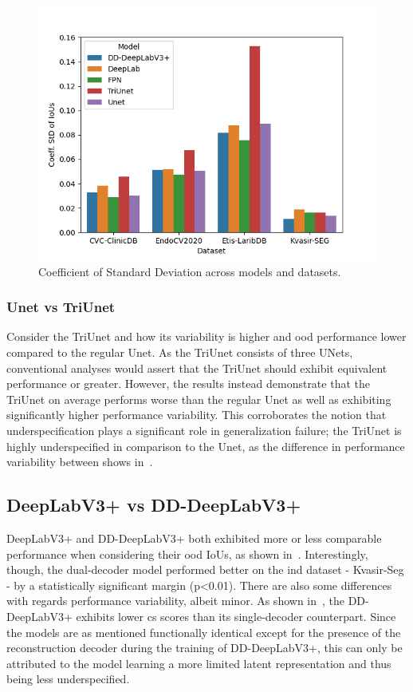     \begin{figure}[htb]
        \centering
        \includegraphics[width=\linewidth]{illustrations/cstd_baseline.png}
        \caption{Coefficient of Standard Deviation across models and datasets.}
        \label{fig:baseline_cstd}
    \end{figure}
    
    \subsubsection{Unet vs TriUnet}
    Consider the TriUnet and how its variability is higher and \gls{ood} performance lower compared to the regular Unet. As the TriUnet consists of three UNets, conventional analyses would assert that the TriUnet should exhibit equivalent performance or greater. However, the results instead demonstrate that the TriUnet on average performs worse than the regular Unet as well as exhibiting significantly higher performance variability. This corroborates the notion that underspecification plays a significant role in generalization failure; the TriUnet is highly underspecified in comparison to the Unet, as the difference in performance variability between shows in~.
    
    \subsection{DeepLabV3+ vs DD-DeepLabV3+} \label{dd-deeplab}
    DeepLabV3+ and DD-DeepLabV3+ both exhibited more or less comparable performance when considering their \gls{ood} IoUs, as shown in~. Interestingly, though, the dual-decoder model performed better on the \gls{ind} dataset - Kvasir-Seg - by a statistically significant margin (p<0.01). There are also some differences with regards performance variability, albeit minor. As shown in~, the DD-DeepLabV3+ exhibits lower \gls{cs} scores than its single-decoder counterpart. Since the models are as mentioned functionally identical except for the presence of the reconstruction decoder during the training of DD-DeepLabV3+, this can only be attributed to the model learning a more limited latent representation and thus being less underspecified. 
    
